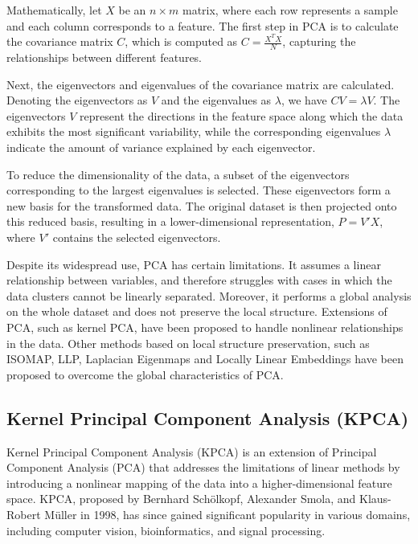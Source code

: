 Mathematically, let $X$ be an $n \times m$ matrix, where each row represents a sample and each column corresponds to a feature. The first step in PCA is to calculate the covariance matrix $C$, which is computed as $C = \frac{X^T X}{N}$, capturing the relationships between different features.

Next, the eigenvectors and eigenvalues of the covariance matrix are calculated. Denoting the eigenvectors as $V$ and the eigenvalues as $\lambda$, we have $C V = \lambda V$. The eigenvectors $V$ represent the directions in the feature space along which the data exhibits the most significant variability, while the corresponding eigenvalues $\lambda$ indicate the amount of variance explained by each eigenvector.

To reduce the dimensionality of the data, a subset of the eigenvectors corresponding to the largest eigenvalues is selected. These eigenvectors form a new basis for the transformed data. The original dataset is then projected onto this reduced basis, resulting in a lower-dimensional representation, $P = V' X$, where $V'$ contains the selected eigenvectors.

Despite its widespread use, PCA has certain limitations. It assumes a linear relationship between variables, and therefore struggles with cases in which the data clusters cannot be linearly separated. Moreover, it performs a global analysis on the whole dataset and does not preserve the local structure.
Extensions of PCA, such as kernel PCA, have been proposed to handle nonlinear relationships in the data. Other methods based on local structure preservation, such as ISOMAP, LLP, Laplacian Eigenmaps and Locally Linear Embeddings have been proposed to overcome the global characteristics of PCA.


\subsection{Kernel Principal Component Analysis (KPCA)}
Kernel Principal Component Analysis (KPCA) is an extension of Principal Component Analysis (PCA) that addresses the limitations of linear methods by introducing a nonlinear mapping of the data into a higher-dimensional feature space. KPCA, proposed by Bernhard Schölkopf, Alexander Smola, and Klaus-Robert Müller in 1998, has since gained significant popularity in various domains, including computer vision, bioinformatics, and signal processing.

